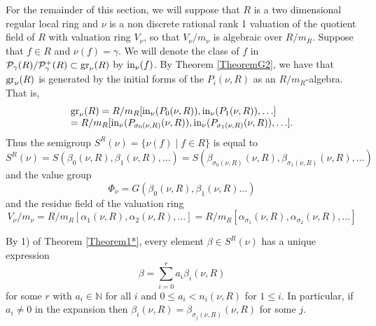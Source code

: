 \documentclass[11pt]{amsart}
\def\NZQ{\mathbb}               %
\def\NN{{\NZQ N}}
\begin{document}
For the remainder of this section, we will suppose that $R$ is a two dimensional regular local ring and $\nu$ is a non discrete rational rank 1  valuation of the quotient field of $R$ with valuation ring $V_{\nu}$, so that $V_{\nu}/m_{\nu}$ is algebraic over $R/m_R$. Suppose that $f\in R$ and $\nu(f)=\gamma$. We will denote the class of $f$ in $\mathcal P_{\gamma}(R)/\mathcal P^+_{\gamma}(R)\subset {\rm gr}_{\nu}(R)$ by ${\rm in}_{\nu}(f)$.
By Theorem \ref{TheoremG2}, we have that ${\rm gr}_{\nu}(R)$ is generated by the initial forms of the $P_i(\nu,R)$ as an $R/m_R$-algebra. That is, 
$$
\begin{array}{l}
{\rm gr}_{\nu}(R)=R/m_R[{\rm in}_{\nu}(P_0(\nu,R)),{\rm in}_{\nu}(P_1(\nu,R)),\ldots]\\
=R/m_R[{\rm in}_{\nu}(P_{\sigma_0(\nu,R)}(\nu,R)),{\rm in}_{\nu}(P_{\sigma_1(\nu,R)}(\nu,R)),\ldots].
\end{array}
$$
Thus the semigroup
$S^R(\nu)=\{\nu(f)\mid f\in R\}$ is equal to 
$$
S^R(\nu)=S(\beta_0(\nu,R),\beta_1(\nu,R),\ldots)=S(\beta_{\sigma_0(\nu,R)}(\nu,R),\beta_{\sigma_1(\nu,R)}(\nu,R),\ldots)
$$
and the value group
$$
\Phi_{\nu}=G(\beta_0(\nu,R),\beta_1(\nu,R)\ldots)
$$
and the residue field of the valuation ring
$$
V_{\nu}/m_{\nu}=R/m_R[\alpha_1(\nu,R),\alpha_2(\nu,R),\ldots]=R/m_R[\alpha_{\sigma_1}(\nu,R),\alpha_{\sigma_2}(\nu,R),\ldots]
$$


 By 1) of Theorem \ref{Theorem1*}, every element $\beta\in S^{R}(\nu)$ has a unique expression
 $$
 \beta=\sum_{i=0}^ra_i\beta_i(\nu,R)
 $$
 for some $r$ with $a_i\in \NN$ for all $i$ and $0\le a_i<n_i(\nu,R)$ for $1\le i$. In particular, if $a_i\ne 0$ in the expansion then $\beta_i(\nu,R)=\beta_{\sigma_j(\nu,R)}(\nu,R)$ for some $j$.
\end{document}

